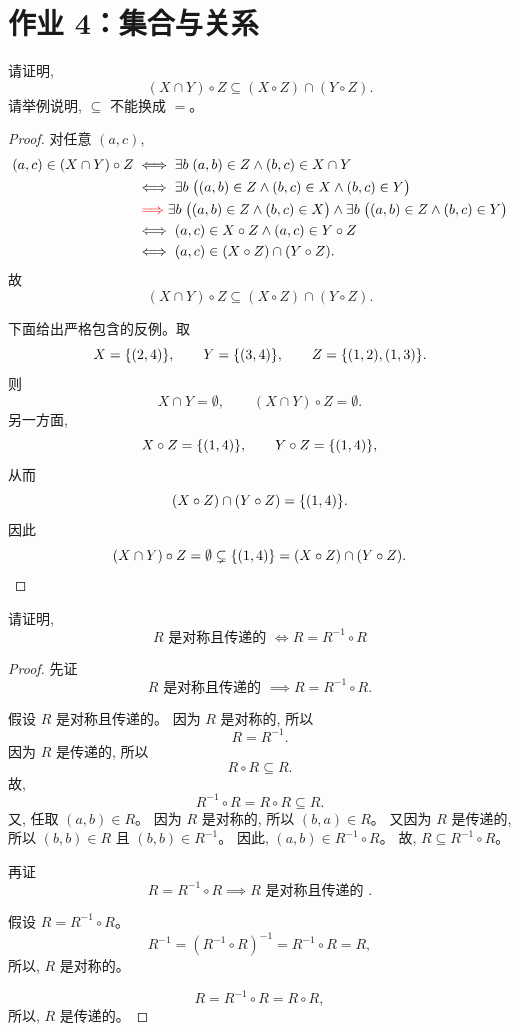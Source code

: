 
\newpage
\section{作业 4：集合与关系}

\begin{problem}[关系的运算]
  请证明,
  \[
    (X \cap Y) \circ Z \subseteq (X \circ Z) \cap (Y \circ Z).
  \]
  请举例说明, $\subseteq$ 不能换成 $=$。
\end{problem}

\begin{proof}
  对任意 $(a, c)$,
  \begin{align*}
    (a, c) \in (X \cap Y) \circ Z
      &\iff \exists b\; (a, b) \in Z \land (b, c) \in X \cap Y \\
      &\iff \exists b\; \big((a, b) \in Z \land (b, c) \in X \land (b, c) \in Y\big) \\
      &\;\textcolor{red}{\implies} \exists b\; \big((a, b) \in Z \land (b, c) \in X\big)
        \land \exists b\; \big((a, b) \in Z \land (b, c) \in Y\big) \\
      &\iff (a, c) \in X \circ Z \land (a, c) \in Y \circ Z \\
      &\iff (a, c) \in (X \circ Z) \cap (Y \circ Z).
  \end{align*}
  故
  \[
    (X \cap Y) \circ Z \subseteq (X \circ Z) \cap (Y \circ Z).
  \]

  下面给出严格包含的反例。取
  \[
    X = \{(2, 4)\},
    \qquad
    Y = \{(3, 4)\},
    \qquad
    Z = \{(1, 2), (1, 3)\}.
  \]
  则
  \[
    X \cap Y = \emptyset,
    \qquad
    (X \cap Y) \circ Z = \emptyset.
  \]
  另一方面,
  \[
    X \circ Z = \{(1, 4)\},
    \qquad
    Y \circ Z = \{(1, 4)\},
  \]
  从而
  \[
    (X \circ Z) \cap (Y \circ Z) = \{(1, 4)\}.
  \]
  因此
  \[
    (X \cap Y) \circ Z = \emptyset \subsetneq \{(1, 4)\} = (X \circ Z) \cap (Y \circ Z).
  \]
\end{proof}

\begin{problem}[关系的性质]
  请证明,
  \[
    R \text{ 是对称且传递的 } \iff R = R^{-1} \circ R
  \]
\end{problem}

\begin{proof}
	先证
  \[
    R \text{ 是对称且传递的 } \implies R = R^{-1} \circ R.
  \]

  假设 $R$ 是对称且传递的。
  因为 $R$ 是对称的, 所以
  \[
    R = R^{-1}.
  \]
  因为 $R$ 是传递的, 所以
  \[
    R \circ R \subseteq R.
  \]
  故,
  \[
    R^{-1} \circ R = R \circ R \subseteq R.
  \]
  又, 任取 $(a, b) \in R$。
  因为 $R$ 是对称的, 所以 $(b, a) \in R$。
  又因为 $R$ 是传递的, 所以 $(b, b) \in R$ 且 $(b, b) \in R^{-1}$。
  因此, $(a, b) \in R^{-1} \circ R$。
	故, $R \subseteq R^{-1} \circ R$。

  再证
  \[
     R = R^{-1} \circ R \implies R \text{ 是对称且传递的 }.
  \]

  假设 $R = R^{-1} \circ R$。
  \[
    R^{-1} = (R^{-1} \circ R)^{-1} = R^{-1} \circ R = R,
  \]
  所以, $R$ 是对称的。

  \[
    R = R^{-1} \circ R = R \circ R,
  \]
  所以, $R$ 是传递的。
\end{proof}